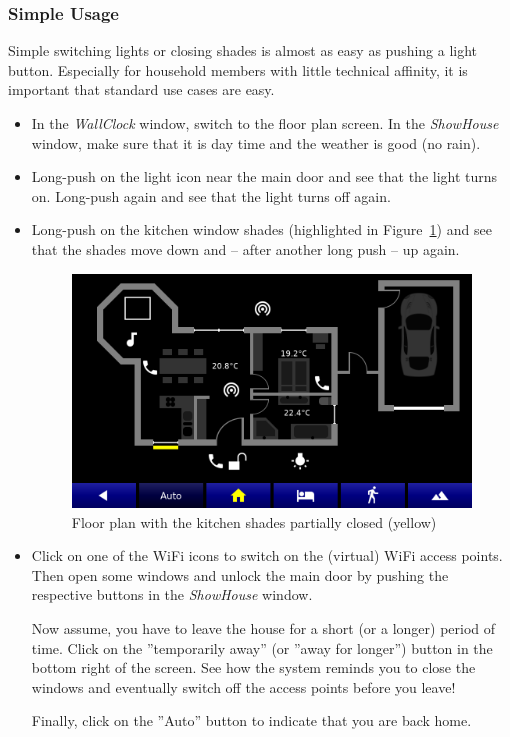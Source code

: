 \documentclass[12pt,english,parskip=half,headheight=19pt]{scrreprt}
\begin{document}
\subsubsection{Simple Usage}

Simple switching lights or closing shades is almost as easy as pushing a light button.
Especially for household members with little technical affinity, it is important that standard use cases are easy.

\begin{itemize}[$\blacktriangleright$]

  \item
    In the \textit{WallClock} window, switch to the floor plan screen. In the \textit{ShowHouse} window,
    make sure that it is day time and the weather is good (no rain).

  \item
    Long-push on the light icon near the main door and see that the light turns on.
    Long-push again and see that the light turns off again.

  \item
    Long-push on the kitchen window shades (highlighted in Figure~\ref{fig:tutorial-floorplan-shades}) and
    see that the shades move down and -- after another long push -- up again.

    \begin{figure}[ht]
      \centering
      \includegraphics[width=0.65\linewidth]{figs/wallclock-floorplan-shades.png}
      \caption[l]{Floor plan with the kitchen shades partially closed (yellow)}
      \label{fig:tutorial-floorplan-shades}
    \end{figure}

  \item
    Click on one of the WiFi icons to switch on the (virtual) WiFi access points.
    Then open some windows and unlock the main door by pushing the respective buttons in the
    \textit{ShowHouse} window.

    Now assume, you have to leave the house for a short (or a longer) period of time.
    Click on the ''temporarily away'' (or ''away for longer'') button in the bottom right
    of the screen. See how the system reminds you to close the windows and eventually
    switch off the access points before you leave!

    Finally, click on the ''Auto'' button to indicate that you are back home.

\end{itemize}
\end{document}
